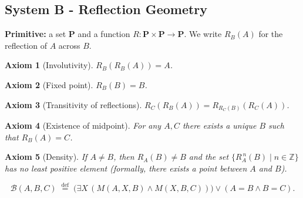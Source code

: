 \documentclass[]{article}
\newtheorem{axiom}{Axiom}
\begin{document}
\subsection*{System B - Reflection Geometry}
\textbf{Primitive:} a set \(\mathbf{P}\) and a function
\(R : \mathbf{P} \times \mathbf{P} \to \mathbf{P}\).  We write
\(R_B(A)\) for the reflection of \(A\) across \(B\).

\begin{axiom}[Involutivity]
  \(R_B(R_B(A)) = A\).
\end{axiom}
\begin{axiom}[Fixed point]
  \(R_B(B) = B\).
\end{axiom}
\begin{axiom}[Transitivity of reflections]
  \(R_C(R_B(A)) = R_{R_C(B)}(R_C(A))\).
\end{axiom}
\begin{axiom}[Existence of midpoint]
  For any \(A,C\) there exists a unique \(B\) such that \(R_B(A)=C\).
\end{axiom}
\begin{axiom}[Density]
  If \(A \neq B\), then \(R_A(B) \neq B\) and the set
  \(\{R_A^{\,n}(B) \mid n \in \mathbb{Z}\}\) has no least positive element
  (formally, there exists a point between \(A\) and \(B\)).
\end{axiom}
\[
\mathcal{B}(A,B,C) \;\overset{\text{def}}{=}\;
\bigl( \exists X\, (M(A,X,B) \land M(X,B,C)) \bigr) \lor (A=B \land B=C).
\]
\end{document}
